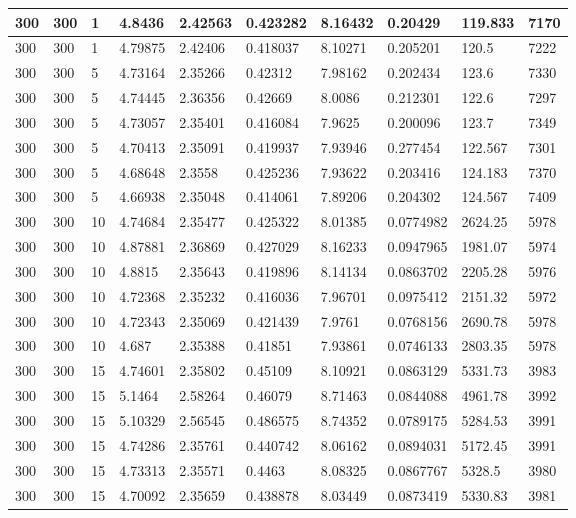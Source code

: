 \begin{landscape}
\begin{longtable}{ | l | l | l | l | l | l | l | l | l | l | }
300 & 300 & 1 & 4.8436 & 2.42563 & 0.423282 & 8.16432 & 0.20429 & 119.833 & 7170\\ \hline
300 & 300 & 1 & 4.79875 & 2.42406 & 0.418037 & 8.10271 & 0.205201 & 120.5 & 7222\\ \hline
300 & 300 & 5 & 4.73164 & 2.35266 & 0.42312 & 7.98162 & 0.202434 & 123.6 & 7330\\ \hline
300 & 300 & 5 & 4.74445 & 2.36356 & 0.42669 & 8.0086 & 0.212301 & 122.6 & 7297\\ \hline
300 & 300 & 5 & 4.73057 & 2.35401 & 0.416084 & 7.9625 & 0.200096 & 123.7 & 7349\\ \hline
300 & 300 & 5 & 4.70413 & 2.35091 & 0.419937 & 7.93946 & 0.277454 & 122.567 & 7301\\ \hline
300 & 300 & 5 & 4.68648 & 2.3558 & 0.425236 & 7.93622 & 0.203416 & 124.183 & 7370\\ \hline
300 & 300 & 5 & 4.66938 & 2.35048 & 0.414061 & 7.89206 & 0.204302 & 124.567 & 7409\\ \hline
300 & 300 & 10 & 4.74684 & 2.35477 & 0.425322 & 8.01385 & 0.0774982 & 2624.25 & 5978\\ \hline
300 & 300 & 10 & 4.87881 & 2.36869 & 0.427029 & 8.16233 & 0.0947965 & 1981.07 & 5974\\ \hline
300 & 300 & 10 & 4.8815 & 2.35643 & 0.419896 & 8.14134 & 0.0863702 & 2205.28 & 5976\\ \hline
300 & 300 & 10 & 4.72368 & 2.35232 & 0.416036 & 7.96701 & 0.0975412 & 2151.32 & 5972\\ \hline
300 & 300 & 10 & 4.72343 & 2.35069 & 0.421439 & 7.9761 & 0.0768156 & 2690.78 & 5978\\ \hline
300 & 300 & 10 & 4.687 & 2.35388 & 0.41851 & 7.93861 & 0.0746133 & 2803.35 & 5978\\ \hline
300 & 300 & 15 & 4.74601 & 2.35802 & 0.45109 & 8.10921 & 0.0863129 & 5331.73 & 3983\\ \hline
300 & 300 & 15 & 5.1464 & 2.58264 & 0.46079 & 8.71463 & 0.0844088 & 4961.78 & 3992\\ \hline
300 & 300 & 15 & 5.10329 & 2.56545 & 0.486575 & 8.74352 & 0.0789175 & 5284.53 & 3991\\ \hline
300 & 300 & 15 & 4.74286 & 2.35761 & 0.440742 & 8.06162 & 0.0894031 & 5172.45 & 3991\\ \hline
300 & 300 & 15 & 4.73313 & 2.35571 & 0.4463 & 8.08325 & 0.0867767 & 5328.5 & 3980\\ \hline
300 & 300 & 15 & 4.70092 & 2.35659 & 0.438878 & 8.03449 & 0.0873419 & 5330.83 & 3981\\ \hline

\end{longtable}
\end{landscape}
